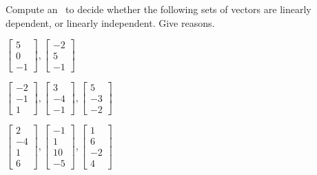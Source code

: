 \begin{exercise} \label{ex:} 
Compute an \svd\ to decide whether the following sets of vectors are linearly dependent, or linearly independent.  Give reasons.
\begin{parts}
\item \(\begin{bmatrix} 5\\0\\-1 \end{bmatrix}, \begin{bmatrix}-2\\5\\-1 \end{bmatrix}\)

\item \(\begin{bmatrix} -2\\-1\\1 \end{bmatrix}, \begin{bmatrix} 3\\-4\\-1 \end{bmatrix}, \begin{bmatrix} 5\\-3\\-2 \end{bmatrix}\)

\item \(\begin{bmatrix} 2\\-4\\1\\6 \end{bmatrix}, \begin{bmatrix} -1\\1\\10\\-5 \end{bmatrix}, \begin{bmatrix}1\\6\\-2\\4 \end{bmatrix}\)


\end{parts}
\end{exercise}
